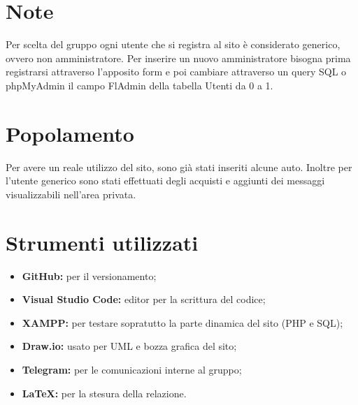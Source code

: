 \appendix
    \section{Note}
    Per scelta del gruppo ogni utente che si registra al sito è considerato generico, ovvero non amministratore. Per inserire un nuovo amministratore bisogna prima registrarsi attraverso l'apposito form e poi cambiare attraverso un query SQL o phpMyAdmin il campo FlAdmin della tabella Utenti da 0 a 1.

    \section{Popolamento}
    Per avere un reale utilizzo del sito, sono già stati inseriti alcune auto. Inoltre per l'utente generico sono stati effettuati degli acquisti e aggiunti dei messaggi visualizzabili nell'area privata.\\

    \section{Strumenti utilizzati}
    \begin{itemize}
        \item \textbf{GitHub:} per il versionamento; 
        \item \textbf{Visual Studio Code:} editor per la scrittura del codice; 
        \item \textbf{XAMPP:} per testare sopratutto la parte dinamica del sito (PHP e SQL);
        \item \textbf{Draw.io:} usato per UML e bozza grafica del sito;
        \item \textbf{Telegram:} per le comunicazioni interne al gruppo;
        \item \textbf{\LaTeX:} per la stesura della relazione.
    \end{itemize}
\pagebreak